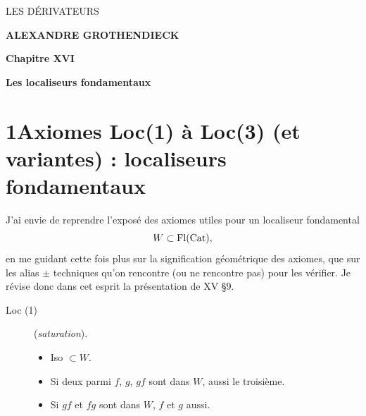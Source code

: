 \dgrchunkbegin


\begin{center}
{\sffamily\LARGE LES DÉRIVATEURS}

\bigskip

{\large\textbf{ALEXANDRE GROTHENDIECK}}

\vspace{3em}

{\large\textbf{Chapitre XVI}}

\medskip

{\large\textbf{Les localiseurs fondamentaux}}
\end{center}

\clearpage



\clearpage



\section*{1\quad Axiomes Loc(1) à Loc(3) (et variantes) : localiseurs fondamentaux}

J’ai envie de reprendre l’exposé des axiomes utiles pour un localiseur fondamental
\[
W \subset \mathrm{Fl}(\mathrm{Cat}),
\]
en me guidant cette fois plus sur la signification géométrique des axiomes, que sur les alias $\pm$ techniques qu’on rencontre (ou ne rencontre pas) pour les vérifier. Je révise donc dans cet esprit la présentation de XV §9.

\begin{description}
\item[Loc (1)] (\textit{saturation}).
\begin{itemize}
\item[\textit{a})] Iso $\subset W$.
\item[\textit{b})] Si deux parmi $f$, $g$, $gf$ sont dans $W$, aussi le troisième.
\item[\textit{c})] Si $gf$ et $fg$ sont dans $W$, $f$ et $g$ aussi.
\end{itemize}
\end{description}

